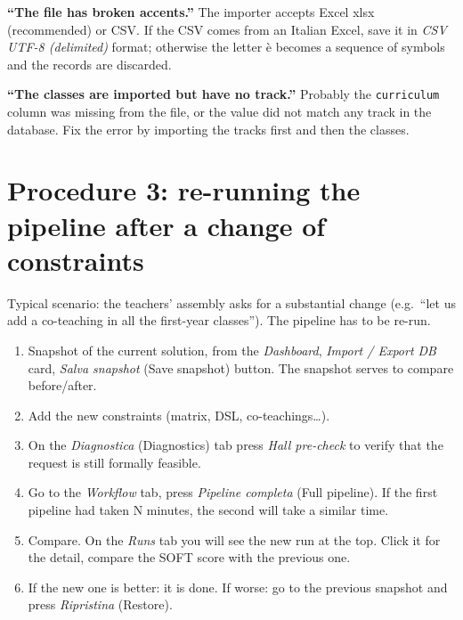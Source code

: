 \begin{erroricomunibox}
\textbf{``The file has broken accents.''} The importer accepts
Excel xlsx (recommended) or CSV. If the CSV comes from an
Italian Excel, save it in \emph{CSV UTF-8 (delimited)} format;
otherwise the letter \`e becomes a sequence of symbols and the
records are discarded.

\textbf{``The classes are imported but have no track.''}
Probably the \texttt{curriculum} column was missing from the
file, or the value did not match any track in the database. Fix
the error by importing the tracks first and then the classes.
\end{erroricomunibox}


\section{Procedure 3: re-running the pipeline after a change of constraints}
\label{sec:wf_relancia}

Typical scenario: the teachers' assembly asks for a substantial
change (e.g.\ ``let us add a co-teaching in all the first-year
classes''). The pipeline has to be re-run.

\begin{enumerate}
\item Snapshot of the current solution, from the \emph{Dashboard},
  \emph{Import / Export DB} card, \emph{Salva snapshot} (Save
  snapshot) button. The snapshot serves to compare before/after.
\item Add the new constraints (matrix, DSL, co-teachings\dots).
\item On the \emph{Diagnostica} (Diagnostics) tab press
  \emph{Hall pre-check} to verify that the request is still
  formally feasible.
\item Go to the \emph{Workflow} tab, press \emph{Pipeline
  completa} (Full pipeline). If the first pipeline had taken N
  minutes, the second will take a similar time.
\item Compare. On the \emph{Runs} tab you will see the new run at
  the top. Click it for the detail, compare the SOFT score with
  the previous one.
\item If the new one is better: it is done. If worse: go to the
  previous snapshot and press \emph{Ripristina} (Restore).
\end{enumerate}

